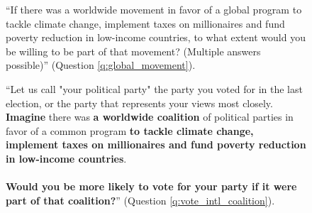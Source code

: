 \begin{figure}[h!]
    \caption[Willingness to participate in a global movement for sustainable development]{``If there was a worldwide movement in favor of a global program to tackle climate change, implement taxes on millionaires and fund poverty reduction in low-income countries, to what extent would you be willing to be part of that movement? (Multiple answers possible)'' (Question \ref{q:global_movement}).
    }\label{fig:global_movement}
\end{figure}

\begin{figure}[h!]
    \caption[Stated influence on vote that a party be part of a worldwide coalition for sustainable development]{``Let us call "your political party" the party you voted for in the last election, or the party that represents your views most closely.~\\\textbf{Imagine }there was \textbf{a worldwide coalition} of political parties in favor of a common program \textbf{to tackle climate change, implement taxes on millionaires and fund poverty reduction in low-income countries}.~\\\\\textbf{Would you be more likely to vote for your party if it were part of that coalition?}'' (Question \ref{q:vote_intl_coalition}).
    }\label{fig:vote_intl_coalition}
\end{figure}


